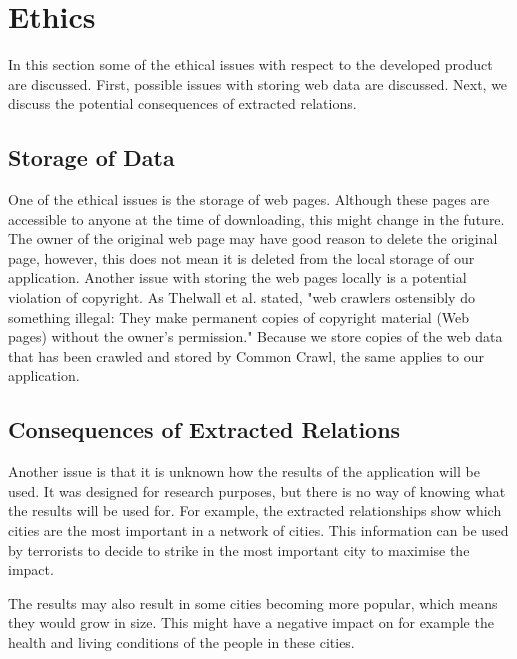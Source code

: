 \section{Ethics}
In this section some of the ethical issues with respect to the developed product are discussed. First, possible issues with storing web data are discussed. Next, we discuss the potential consequences of extracted relations.

\subsection{Storage of Data}
One of the ethical issues is the storage of web pages. Although these pages are accessible to anyone at the time of downloading, this might change in the future. The owner of the original web page may have good reason to delete the original page, however, this does not mean it is deleted from the local storage of our application. Another issue with storing the web pages locally is a potential violation of copyright. As Thelwall et al. stated, "web crawlers ostensibly do something illegal: They make permanent copies of copyright material (Web pages) without the owner’s permission."\cite{thelwall2006web} Because we store copies of the web data that has been crawled and stored by Common Crawl, the same applies to our application.

\subsection{Consequences of Extracted Relations}
Another issue is that it is unknown how the results of the application will be used. It was designed for research purposes, but there is no way of knowing what the results will be used for. For example, the extracted relationships show which cities are the most important in a network of cities. This information can be used by terrorists to decide to strike in the most important city to maximise the impact. 

The results may also result in some cities becoming more popular, which means they would grow in size. This might have a negative impact on for example the health and living conditions of the people in these cities.

